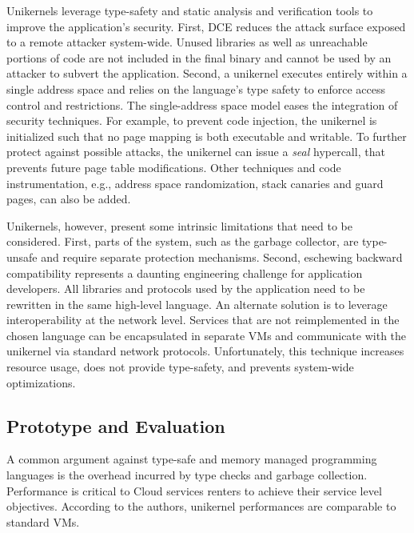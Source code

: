 Unikernels leverage type-safety and static analysis and verification tools to improve the application's security.
First, DCE reduces the attack surface exposed to a remote attacker system-wide.
Unused libraries as well as unreachable portions of code are not included in the final binary and cannot be used by an attacker to subvert the application.
Second, a unikernel executes entirely within a single address space and relies on the language's type safety to enforce access control and restrictions.
The single-address space model eases the integration of security techniques. 
For example, to prevent code injection, the unikernel is initialized such that no page mapping is both executable and writable.
To further protect against possible attacks, the unikernel can issue a \emph{seal} hypercall, that prevents future page table modifications.
Other techniques and code instrumentation, e.g., address space randomization, stack canaries and guard pages, can also be added.

Unikernels, however, present some intrinsic limitations that need to be considered.
First, parts of the system, such as the garbage collector, are type-unsafe and require separate protection mechanisms.
Second, eschewing backward compatibility represents a daunting engineering challenge for application developers.
All libraries and protocols used by the application need to be rewritten in the same high-level language.
An alternate solution is to leverage interoperability at the network level.
Services that are not reimplemented in the chosen language can be encapsulated in separate VMs and communicate with the unikernel via standard network protocols.
Unfortunately, this technique increases resource usage, does not provide type-safety, and prevents system-wide optimizations.


\subsection{Prototype and Evaluation}

A common argument against type-safe and memory managed programming languages is the overhead incurred by type checks and garbage collection.
Performance is critical to Cloud services renters to achieve their service level objectives.
According to the authors, unikernel performances are comparable to standard VMs.

